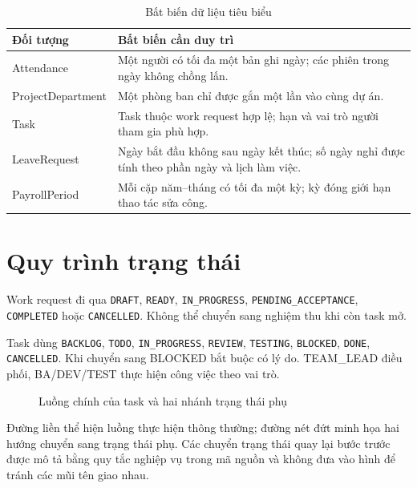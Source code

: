\documentclass[12pt,a4paper,oneside]{report}
\newcommand{\code}[1]{\texttt{#1}}
\begin{document}
\begin{table}[H]\centering\caption{Bất biến dữ liệu tiêu biểu}
\begin{tabularx}{\textwidth}{p{4.3cm}X}\toprule
\textbf{Đối tượng}&\textbf{Bất biến cần duy trì}\\\midrule
Attendance&Một người có tối đa một bản ghi ngày; các phiên trong ngày không chồng lấn.\\
ProjectDepartment&Một phòng ban chỉ được gắn một lần vào cùng dự án.\\
Task&Task thuộc work request hợp lệ; hạn và vai trò người tham gia phù hợp.\\
LeaveRequest&Ngày bắt đầu không sau ngày kết thúc; số ngày nghỉ được tính theo phần ngày và lịch làm việc.\\
PayrollPeriod&Mỗi cặp năm--tháng có tối đa một kỳ; kỳ đóng giới hạn thao tác sửa công.\\\bottomrule
\end{tabularx}\end{table}

\section{Quy trình trạng thái}
Work request đi qua \code{DRAFT}, \code{READY}, \code{IN\_PROGRESS}, \code{PENDING\_ACCEPTANCE}, \code{COMPLETED} hoặc \code{CANCELLED}. Không thể chuyển sang nghiệm thu khi còn task mở.

Task dùng \code{BACKLOG}, \code{TODO}, \code{IN\_PROGRESS}, \code{REVIEW}, \code{TESTING}, \code{BLOCKED}, \code{DONE}, \code{CANCELLED}. Khi chuyển sang BLOCKED bắt buộc có lý do. TEAM\_LEAD điều phối, BA/DEV/TEST thực hiện công việc theo vai trò.

\begin{figure}[H]\centering
{}
\caption{Luồng chính của task và hai nhánh trạng thái phụ}\label{fig:taskflow}
\end{figure}
Đường liền thể hiện luồng thực hiện thông thường; đường nét đứt minh họa hai hướng chuyển sang trạng thái phụ. Các chuyển trạng thái quay lại bước trước được mô tả bằng quy tắc nghiệp vụ trong mã nguồn và không đưa vào hình để tránh các mũi tên giao nhau.
\end{document}
